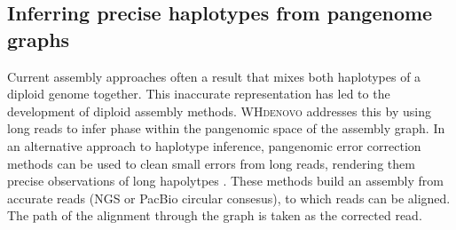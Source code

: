 %

\subsection{Inferring precise haplotypes from pangenome graphs}


Current assembly approaches often a result that mixes both haplotypes of a diploid genome together.
This inaccurate representation has led to the development of diploid assembly methods.
\textsc{WHdenovo} \cite{garg2019trio, garg2018graph} addresses this by using long reads to infer phase within the pangenomic space of the assembly graph.
In an alternative approach to haplotype inference, pangenomic error correction methods can be used to clean small errors from long reads, rendering them precise observations of long hapolytpes \cite{Salmela2016LORMA,Rautiainen_2019b}.
These methods build an assembly from accurate reads (NGS or PacBio circular consesus), to which reads can be aligned.
The path of the alignment through the graph is taken as the corrected read.


